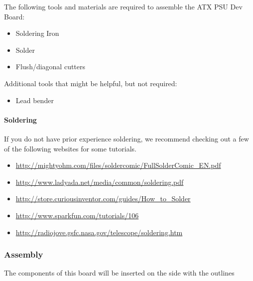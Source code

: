 The following tools and materials are required to assemble the ATX PSU
Dev Board:

\begin{itemize}
\item
  Soldering Iron
\item
  Solder
\item
  Flush/diagonal cutters
\end{itemize}

Additional tools that might be helpful, but not required:

\begin{itemize}
\item
  Lead bender
\end{itemize}

\paragraph{Soldering}

If you do not have prior experience soldering, we recommend checking out
a few of the following websites for some tutorials.

\begin{itemize}
\item
  \url{http://mightyohm.com/files/soldercomic/FullSolderComic_EN.pdf}
\item
  \url{http://www.ladyada.net/media/common/soldering.pdf}
\item
  \url{http://store.curiousinventor.com/guides/How_to_Solder}
\item
  \url{http://www.sparkfun.com/tutorials/106}
\item
  \url{http://radiojove.gsfc.nasa.gov/telescope/soldering.htm}
\end{itemize}

\subsubsection{Assembly}

The components of this board will be inserted on the side with the
outlines

